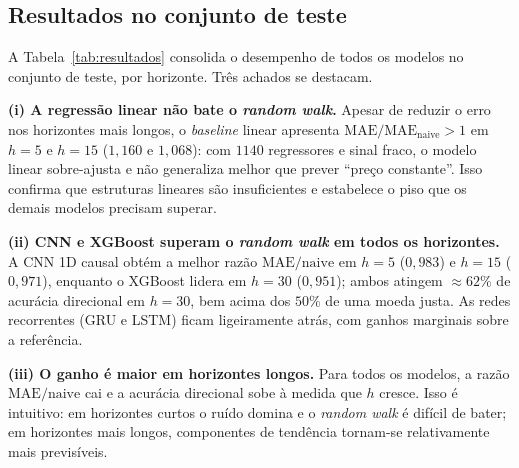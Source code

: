 \documentclass[12pt]{article}
\begin{document}
\subsection{Resultados no conjunto de teste}
\label{sec:resultados}

A Tabela~\ref{tab:resultados} consolida o desempenho de todos os modelos no
conjunto de teste, por horizonte. Três achados se destacam.

\textbf{(i) A regressão linear não bate o \emph{random walk}.} Apesar de
reduzir o erro nos horizontes mais longos, o \emph{baseline} linear apresenta
$\mathrm{MAE}/\mathrm{MAE}_{\text{naive}} > 1$ em $h=5$ e $h=15$ ($1{,}160$ e
$1{,}068$): com $1140$ regressores e sinal fraco, o modelo linear sobre-ajusta
e não generaliza melhor que prever ``preço constante''. Isso confirma que
estruturas lineares são insuficientes e estabelece o piso que os demais modelos
precisam superar.

\textbf{(ii) CNN e XGBoost superam o \emph{random walk} em todos os
horizontes.} A CNN 1D causal obtém a melhor razão $\mathrm{MAE}/\mathrm{naive}$
em $h=5$ ($0{,}983$) e $h=15$ ($0{,}971$), enquanto o XGBoost lidera em $h=30$
($0{,}951$); ambos atingem $\approx 62\%$ de acurácia direcional em $h=30$,
bem acima dos $50\%$ de uma moeda justa. As redes recorrentes (GRU e LSTM) ficam
ligeiramente atrás, com ganhos marginais sobre a referência.

\textbf{(iii) O ganho é maior em horizontes longos.} Para todos os modelos, a
razão $\mathrm{MAE}/\mathrm{naive}$ cai e a acurácia direcional sobe à medida que
$h$ cresce. Isso é intuitivo: em horizontes curtos o ruído domina e o
\emph{random walk} é difícil de bater; em horizontes mais longos, componentes de
tendência tornam-se relativamente mais previsíveis.
\end{document}
